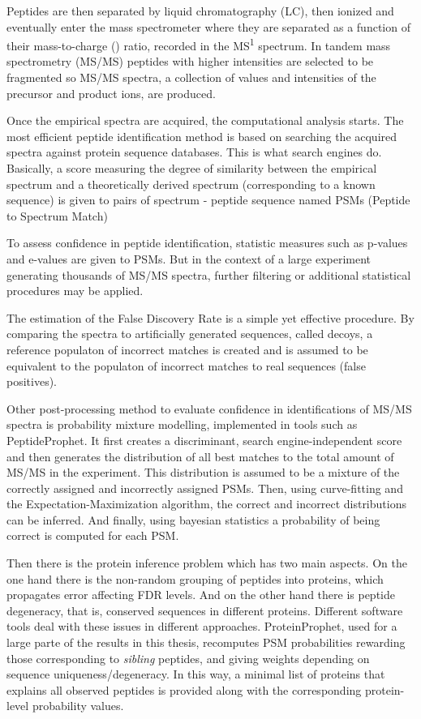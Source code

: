 Peptides are then separated by liquid chromatography (LC), then ionized
and eventually enter the mass spectrometer where they are separated
as a function of their mass-to-charge (\mz) ratio, recorded in the MS\textsuperscript{1} spectrum.
In tandem mass spectrometry (MS/MS)
peptides with higher intensities are selected to be fragmented so 
MS/MS spectra, a collection of \mz values and intensities of the precursor and product ions, are produced.

Once the empirical spectra are acquired, the computational analysis starts.
The most efficient peptide identification method is based on searching 
the acquired spectra against protein sequence databases. This is what
search engines do. Basically, a score measuring the degree of similarity 
between the empirical spectrum and a theoretically derived spectrum (corresponding to a known 
sequence) is given to pairs of spectrum - peptide sequence named PSMs (Peptide to Spectrum Match)

To assess confidence in peptide identification, statistic measures such
as p-values and e-values are given to PSMs. But in the context of a large
experiment generating thousands of MS/MS spectra, further filtering or additional
statistical procedures may be applied.

The estimation of the False Discovery Rate is a simple yet effective procedure. By comparing the 
spectra to artificially generated sequences, called decoys, a reference populaton 
of incorrect matches is created and is assumed to be equivalent to the populaton
of incorrect matches to real sequences (false positives).

Other post-processing method to evaluate confidence in identifications of MS/MS spectra 
is probability mixture modelling, implemented in tools such as PeptideProphet. It 
first creates a discriminant, search engine-independent score and then generates
the distribution of all best matches to the total amount of MS/MS in the experiment.
This distribution is assumed to be a mixture of the correctly assigned and incorrectly assigned
PSMs. Then, using curve-fitting and the Expectation-Maximization algorithm, the correct
and incorrect distributions can be inferred. And finally, using bayesian statistics
a probability of being correct is computed for each PSM.

Then there is the protein inference problem which has two main aspects.
On the one hand there is the non-random grouping of peptides into proteins, 
which propagates error affecting FDR levels. And on the other hand there is 
peptide degeneracy, that is, conserved sequences in different proteins.
Different software tools deal with these issues in different approaches. 
ProteinProphet, used for a large parte of the results in this thesis, recomputes
PSM probabilities rewarding those corresponding to \emph{sibling} peptides, 
and giving weights depending on sequence uniqueness/degeneracy. 
In this way, a minimal list of proteins that explains all observed peptides
is provided along with the corresponding protein-level probability values.


